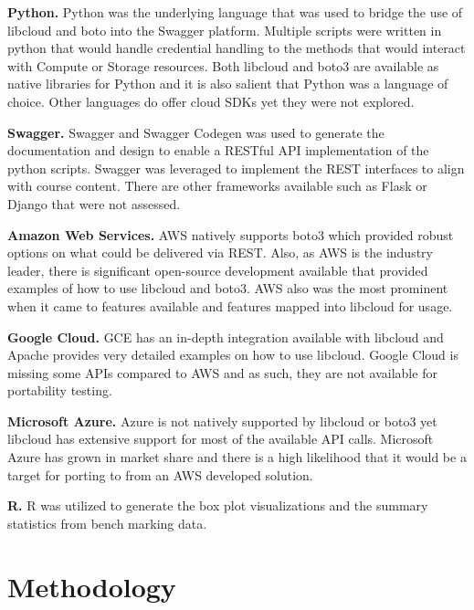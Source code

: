 \begin{description}

\item{\bf Python.} Python was the underlying language that was used to bridge
the use of libcloud and boto into the Swagger platform. Multiple scripts were
written in python that would handle credential handling to the methods that
would interact with Compute or Storage resources. Both libcloud and boto3 are
available as native libraries for Python and it is also salient that Python was
a language of choice. Other languages do offer cloud SDKs yet they were not
explored.
\item{\bf Swagger.} Swagger and Swagger Codegen was used to generate the
documentation and design to enable a RESTful API implementation of the python
scripts. Swagger was leveraged to implement the REST interfaces to
align with course content. There are other frameworks available such as Flask
or
Django that were not assessed.
\item{\bf Amazon Web Services.} AWS natively supports boto3 which provided
robust options on what could be delivered via REST. Also, as AWS is the
industry
leader, there is significant open-source development available that provided
examples of how to use libcloud and boto3. AWS also was the most prominent when
it came to features available and features mapped into libcloud for usage.
\item{\bf Google Cloud.} GCE has an in-depth integration available with
libcloud and Apache provides very detailed examples on how to use libcloud.
Google Cloud is missing some APIs compared to AWS and as such, they are not
available for portability testing.
\item{\bf Microsoft Azure.} Azure is not natively supported by libcloud or
boto3
yet libcloud has extensive support for most of the available API calls.
Microsoft Azure has grown in market share and there is a high likelihood that
it
would be a target for porting to from an AWS developed solution.

\item{\bf R.} R was utilized to generate the box plot visualizations and
the summary statistics from bench marking data.


\end{description}

\section{Methodology}

